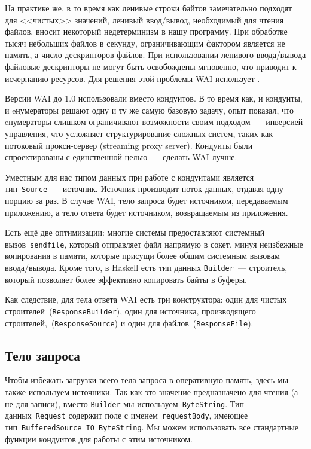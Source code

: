 На практике же, в то время как ленивые строки байтов замечательно подходят для
<<чистых>> значений, ленивый ввод/вывод, необходимый для чтения файлов, вносит
некоторый недетерминизм в нашу программу. При обработке тысяч небольших файлов
в секунду, ограничивающим фактором является не память, а число дескрипторов
файлов. При использовании ленивого ввода/вывода файловые дескрипторы не могут
быть освобождены мгновенно, что приводит к исчерпанию ресурсов. Для решения
этой проблемы WAI использует
.

\begin{remark}
    Версии WAI до 1.0 использовали
    вместо кондуитов. В то время как, и кондуиты, и eнумераторы решают одну и
    ту же самую базовую задачу, опыт показал, что eнумераторы слишком
    ограничивают возможности своим подходом~--- инверсией управления, что
    усложняет структурирование сложных систем, таких как потоковый
    прокси-сервер (streaming proxy server). Кондуиты были спроектированы с
    единственной целью~--- сделать WAI лучше.
\end{remark}

Уместным для нас типом данных при работе с кондуитами является
тип~\lstinline!Source!~--- источник. Источник производит поток данных, отдавая
одну порцию за раз. В случае WAI, тело запроса будет источником, передаваемым
приложению, а тело ответа будет источником, возвращаемым из приложения.

Есть ещё две оптимизации: многие системы предоставляют системный
вызов~\texttt{sendfile}, который отправляет файл напрямую в сокет, минуя
неизбежные копирования в памяти, которые присущи более общим системным вызовам
ввода/вывода. Кроме того, в Haskell есть тип данных \lstinline!Builder!~---
строитель, который позволяет более эффективно копировать байты в буферы.

Как следствие, для тела ответа WAI есть три конструктора: один для чистых
строителей~(\lstinline!ResponseBuilder!), один для источника, производящего
строителей,~(\lstinline!ResponseSource!) и один для
файлов~(\lstinline!ResponseFile!).

\subsection {Тело запроса}
Чтобы избежать загрузки всего тела запроса в оперативную память, здесь мы также
используем источники. Так как это значение предназначено для чтения (а не для
записи), вместо \lstinline!Builder! мы используем~\lstinline!ByteString!. Тип
данных~\lstinline!Request! содержит поле с именем~\lstinline!requestBody!,
имеющее тип~\lstinline!BufferedSource IO ByteString!.  Мы можем использовать
все стандартные функции кондуитов для работы с этим источником.

